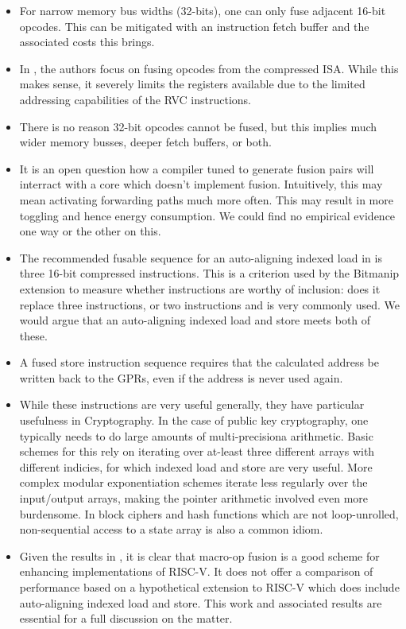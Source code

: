 \begin{itemize}
\item For narrow memory bus widths (32-bits), one can only
    fuse adjacent 16-bit opcodes. This can be mitigated with an
    instruction fetch buffer and the associated costs this brings.

\item In \cite{CDPA:16}, the authors focus on fusing opcodes from the
    compressed ISA. While this makes sense, it severely limits the
    registers available due to the limited addressing capabilities of
    the RVC instructions.

\item There is no reason 32-bit opcodes cannot be fused, but this
    implies much wider memory busses, deeper fetch buffers, or both.

\item It is an open question how a compiler tuned to generate
    fusion pairs will interract with a core which doesn't implement
    fusion. Intuitively, this may mean activating forwarding paths
    much more often. This may result in more toggling and hence
    energy consumption. We could find no empirical evidence one way
    or the other on this.

\item The recommended fusable sequence for an auto-aligning indexed load in
    \cite[Section VI.A]{CDPA:16} is three 16-bit compressed instructions.
    This is a criterion used by the Bitmanip extension to measure whether
    instructions are worthy of inclusion: does it replace three
    instructions, or two instructions and is very commonly used.
    We would argue that an auto-aligning indexed load and store
    meets both of these.

\item A fused store instruction sequence requires that the calculated
    address be written back to the GPRs, even if the address is never
    used again.

\item While these instructions are very useful generally, they have
    particular usefulness in Cryptography.
    In the case of public key cryptography, one typically needs to do
    large amounts of multi-precisiona arithmetic.
    Basic schemes for this rely on iterating over at-least three
    different arrays with different indicies, for which indexed load
    and store are very useful.
    More complex modular exponentiation schemes iterate less regularly
    over the input/output arrays, making the pointer arithmetic involved
    even more burdensome.
    In block ciphers and hash functions which are not loop-unrolled,
    non-sequential access to a state array is also a common idiom.

\item Given the results in \cite{CDPA:16}, it is clear that
    macro-op fusion is a good scheme for enhancing implementations of
    RISC-V.
    It does not offer a comparison of performance based on a
    hypothetical extension to RISC-V which does include
    auto-aligning indexed load and store.
    This work and associated results are essential for a full discussion on
    the matter.
\end{itemize}

